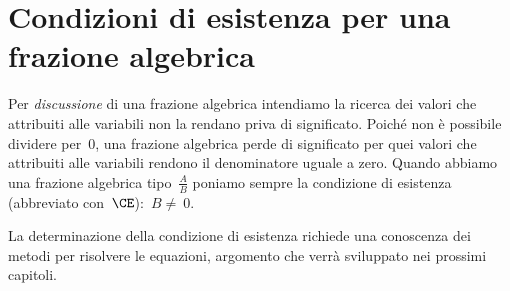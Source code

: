 \section{Condizioni di esistenza per una frazione algebrica}
Per \emph{discussione} di una frazione algebrica intendiamo la ricerca dei valori che attribuiti alle variabili non la rendano
priva di significato. Poiché non è possibile dividere per~$0$, una frazione algebrica perde di significato per quei valori
che attribuiti alle variabili rendono il denominatore uguale a zero. Quando abbiamo una frazione algebrica
tipo~$\frac{A}{B}$ poniamo sempre la condizione di esistenza (abbreviato con~$\CE$):~$B\neq~0$.

La determinazione della condizione di esistenza richiede una conoscenza dei metodi per risolvere le equazioni, argomento che verrà sviluppato nei prossimi capitoli.

